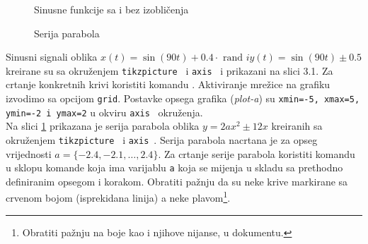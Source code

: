 \documentclass[a4paper,10pt]{article}
\newcommand{\bluetext}[1]
{\texttt{\color{blue}#1}\color{black}~}
\begin{document}
\begin{figure}
    \begin{minipage}{0.5\textwidth}\centering{}
        \caption{Sinusne funkcije sa i bez izobličenja}
        \label{Slicica:fig2}
    \end{minipage}
    \begin{minipage}{0.5\textwidth}\centering{}
        \caption{Serija parabola}
        \label{Slicica:fig3}
    \end{minipage}
\end{figure}\vspace{1mm}\hfill

\noindent{}Sinusni signali oblika $x(t)=\sin (90 t)+0.4 \cdot \text { rand } i y(t)=\sin (90 t) \pm 0.5$ kreirane su sa okruženjem \bluetext{tikzpicture} i \bluetext{axis} i prikazani na slici 3.1. Za crtanje konkretnih krivi koristiti komandu {\color{color2}{\verb|\addplot{}|}}. Aktiviranje mrežice na grafiku izvodimo sa opcijom \texttt{grid}. Postavke opsega grafika (\textsl{plot-a}) su \texttt{xmin=-5, xmax=5, ymin=-2 i ymax=2} u okviru \bluetext{axis} okruženja. \\
Na slici \ref{Slicica:fig3} prikazana je serija parabola oblika $y=2 a x^{2} \pm 12 x$ kreiranih sa okruženjem \bluetext{tikzpicture}  i \bluetext{axis}. Serija parabola nacrtana je za opseg vrijednosti $a=\{-2.4,-2.1, \ldots, 2.4\}$. Za crtanje serije parabola koristiti komandu {\color{color2}{\verb|\addplot{}|}} u sklopu komande {\color{color2}{\verb|\foreach{}|}} koja ima varijablu \texttt{a} koja  se mijenja u skladu sa prethodno definiranim opsegom i korakom. Obratiti pažnju da su neke krive markirane sa crvenom bojom (isprekidana linija) a neke plavom\footnote{Obratiti pažnju na boje kao i njihove nijanse, u dokumentu.}.
\end{document}
